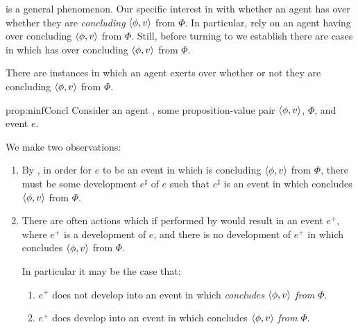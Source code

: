\begin{note}%
  \nocite{Peacocke:2021aa}%
   is a general phenomenon.
  Our specific interest in with whether an agent has \ninf{} over whether they are \emph{concluding} \(\langle \phi, v \rangle\) from \(\Phi\).
  In particular,  rely on an agent having \ninf{} over concluding \(\langle \phi, v \rangle\) from \(\Phi\).
  Still, before turning to  we establish there are cases in which has \ninf{} over concluding \(\langle \phi, v \rangle\) from \(\Phi\).

  \begin{proposition}%
    \label{prop:ninfConcl}%
    There are instances in which an agent exerts  over whether or not they are concluding \(\langle \phi, v \rangle\) from \(\Phi\).
  \end{proposition}

  \begin{argument}{prop:ninfConcl}
    Consider an agent \vAgent{}, some proposition-value pair \(\langle \phi, v \rangle\), \pool{} \(\Phi\), and event \(e\).

    We make two observations:

    \begin{enumerate}[label=\arabic*., ref=(\arabic*), noitemsep]
    \item
      By , in order for \(e\) to be an event in which \vAgent{} is concluding \(\langle \phi, v \rangle\) from \(\Phi\), there must be some  development \(e^{\sharp}\) of \(e\) such that \(e^{\sharp}\) is an event in which \vAgent{} concludes \(\langle \phi, v \rangle\) from \(\Phi\).
    \item
      There are often actions which if performed by \vAgent{} would result in an event \(e^{+}\), where \(e^{+}\) is a development of \(e\), and there is no  development of \(e^{+}\) in which \vAgent{} concludes \(\langle \phi, v \rangle\) from \(\Phi\).

      In particular it may be the case that:
      \begin{enumerate}[label=\alph*., ref=(\alph*)]
      \item
        \label{prop:ninfConcl:obs:2:concludes}
        \(e^{+}\) does not develop into an event in which \vAgent{} \emph{concludes \(\langle \phi, v \rangle\) from \(\Phi\)}.
      \item
        \label{prop:ninfConcl:obs:2:diffPoll}
        \(e^{+}\) does develop into an event in which \vAgent{} concludes \(\langle \phi, v \rangle\) \emph{from \(\Phi\)}.
      \end{enumerate}
    \end{enumerate}


\end{argument}
\end{note}
